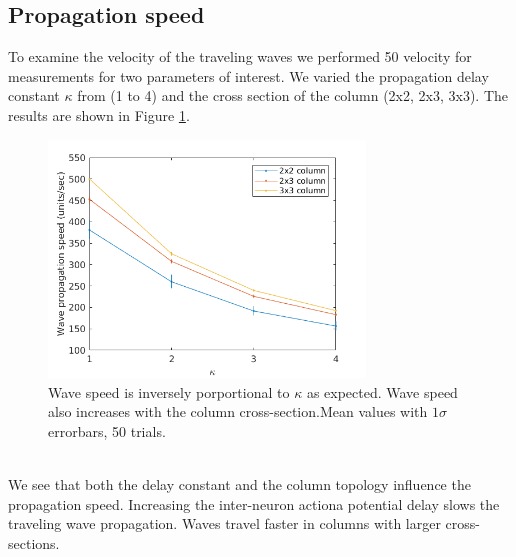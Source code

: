\documentclass[a4paper,11pt]{article}
\begin{document}
\subsection{Propagation speed}
To examine the velocity of the traveling waves we performed 50 velocity for measurements for two parameters of interest.
We varied the propagation delay constant $\kappa$ from (1 to 4) and the cross section of the column (2x2, 2x3, 3x3).
The results are shown in Figure \ref{fig:delay_topology}.
\begin{figure}[!htb]
 \caption{Wave speed is inversely porportional to $\kappa$ as expected. Wave speed also increases with the column cross-section.Mean values with $1\sigma$ errorbars, 50 trials.}
 \label{fig:delay_topology}
 \centering
   \includegraphics[width=0.75\textwidth]{fig/WaveSpeed_DelayTopology}
\end{figure}
\\
We see that both the delay constant and the column topology influence the propagation speed.
Increasing the inter-neuron actiona potential delay slows the traveling wave propagation.
Waves travel faster in columns with larger cross-sections.  
\end{document}
